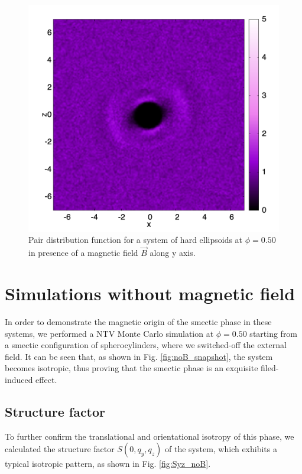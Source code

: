 \documentclass[aip,graphicx]{revtex4-1}
\begin{document}
\begin{figure}
    \centering
    \includegraphics[width=0.7\columnwidth]{gxz_B_HE.png}
    \caption{Pair distribution function for a system of hard ellipsoids at $\phi = 0.50$ in presence of a magnetic field $\vec{B}$ along y axis.}
    \label{fig:gxz_B_HE}
\end{figure}

\section{Simulations without magnetic field}

In order to demonstrate the magnetic origin of the smectic phase in these systems, we performed a NTV Monte Carlo simulation at $\phi=0.50$ starting from a smectic configuration  
of spherocylinders, where we switched-off the external field. 
It can be seen that, as shown in Fig. \ref{fig:noB_snapshot}, the system becomes isotropic, thus proving that the smectic phase is an exquisite filed-induced effect.

\subsection{Structure factor}
To further confirm the translational and orientational isotropy of this phase, 
we calculated the structure factor $S(0, q_y, q_z)$ of the system, which exhibits a typical isotropic pattern, as shown in Fig. \ref{fig:Syz_noB}.

\end{document}
